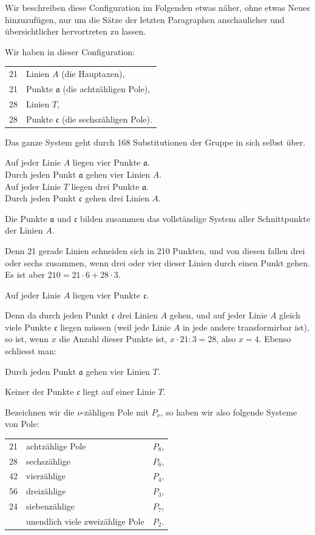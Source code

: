 \documentclass[12pt,a4paper]{article}
\begin{document}
Wir beschreiben diese Configuration im Folgenden etwas n\"aher, ohne etwas Neues hinzuzuf\"ugen, nur um die S\"atze der letzten Paragraphen anschaulicher und \"ubersichtlicher hervortreten zu lassen.

Wir haben in dieser Configuration:
\begin{center}\begin{tabular}{rl}
21 & Linien $A$ (die Hauptaxen),\\
21 & Punkte $\mathfrak{a}$ (die achtz\"ahligen Pole),\\
28 & Linien $T$,\\
28 & Punkte $\mathfrak{c}$ (die sechsz\"ahligen Pole).
\end{tabular}\end{center}

Das ganze System geht durch 168 Substitutionen der Gruppe in sich selbst \"uber.

Auf jeder Linie $A$ liegen vier Punkte $\mathfrak{a}$.\\
Durch jeden Punkt $\mathfrak{a}$ gehen vier Linien $A$.\\
Auf jeder Linie $T$ liegen drei Punkte $\mathfrak{a}$.\\
Durch jeden Punkt $\mathfrak{c}$ gehen drei Linien $A$.

Die Punkte $\mathfrak{a}$ und $\mathfrak{c}$ bilden zusammen das vollst\"andige System aller Schnittpunkte der Linien $A$.

Denn 21 gerade Linien schneiden sich in 210 Punkten, und von diesen fallen drei oder sechs zusammen, wenn drei oder vier dieser Linien durch einen Punkt gehen. Es ist aber $210 = 21 \cdot 6 + 28 \cdot 3$.

Auf jeder Linie $A$ liegen vier Punkte $\mathfrak{c}$.

Denn da durch jeden Punkt $\mathfrak{c}$ drei Linien $A$ gehen, und auf jeder Linie $A$ gleich viele Punkte $\mathfrak{c}$ liegen m\"ussen (weil jede Linie $A$ in jede andere transformirbar ist), so ist, wenn $x$ die Anzahl dieser Punkte ist, $x \cdot 21 : 3 = 28$, also $x = 4$. Ebenso schliesst man:

Durch jeden Punkt $\mathfrak{a}$ gehen vier Linien $T$.

Keiner der Punkte $\mathfrak{c}$ liegt auf einer Linie $T$.

Bezeichnen wir die $\nu$-z\"ahligen Pole mit $P_{\nu}$, so haben wir also folgende Systeme von Pole:
\begin{center}\begin{tabular}{rll}
21 & achtz\"ahlige Pole & $P_8$,\\
28 & sechsz\"ahlige & \phantom{Pole} $P_6$,\\
42 & vierz\"ahlige & \phantom{Pole} $P_4$,\\
56 & dreiz\"ahlige & \phantom{Pole} $P_3$,\\
24 & siebenz\"ahlige & \phantom{Pole} $P_7$,\\
& unendlich viele zweiz\"ahlige Pole & $P_2$.
\end{tabular}\end{center}
\end{document}

